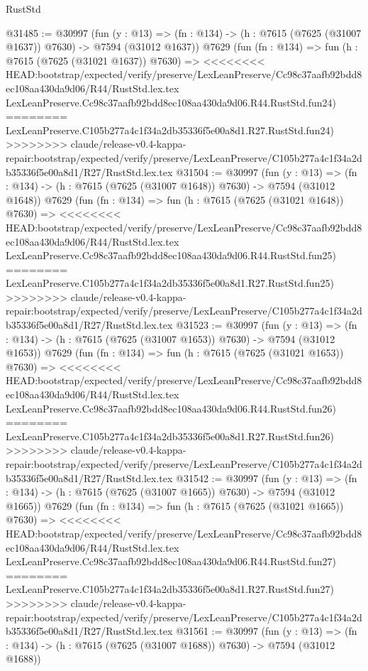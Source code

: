 \begin{lexlean}{RustStd}
\begin{coremodule}
{\begin{coremodule}
{{{{{{{{{{{{{{{{{{{{{{{{{{{{{{{{{{@31485 := @30997
    (fun (y : @13) =>
    (fn : @134) -> (h : @7615 (@7625 (@31007 @1637)) @7630) -> @7594 (@31012 @1637))
    @7629
    (fun (fn : @134) =>
    fun (h : @7615 (@7625 (@31021 @1637)) @7630) =>
<<<<<<<< HEAD:bootstrap/expected/verify/preserve/LexLeanPreserve/Cc98c37aafb92bdd8ec108aa430da9d06/R44/RustStd.lex.tex
    LexLeanPreserve.Cc98c37aafb92bdd8ec108aa430da9d06.R44.RustStd.fun24)
========
    LexLeanPreserve.C105b277a4c1f34a2db35336f5e00a8d1.R27.RustStd.fun24)
>>>>>>>> claude/release-v0.4-kappa-repair:bootstrap/expected/verify/preserve/LexLeanPreserve/C105b277a4c1f34a2db35336f5e00a8d1/R27/RustStd.lex.tex
@31504 := @30997
    (fun (y : @13) =>
    (fn : @134) -> (h : @7615 (@7625 (@31007 @1648)) @7630) -> @7594 (@31012 @1648))
    @7629
    (fun (fn : @134) =>
    fun (h : @7615 (@7625 (@31021 @1648)) @7630) =>
<<<<<<<< HEAD:bootstrap/expected/verify/preserve/LexLeanPreserve/Cc98c37aafb92bdd8ec108aa430da9d06/R44/RustStd.lex.tex
    LexLeanPreserve.Cc98c37aafb92bdd8ec108aa430da9d06.R44.RustStd.fun25)
========
    LexLeanPreserve.C105b277a4c1f34a2db35336f5e00a8d1.R27.RustStd.fun25)
>>>>>>>> claude/release-v0.4-kappa-repair:bootstrap/expected/verify/preserve/LexLeanPreserve/C105b277a4c1f34a2db35336f5e00a8d1/R27/RustStd.lex.tex
@31523 := @30997
    (fun (y : @13) =>
    (fn : @134) -> (h : @7615 (@7625 (@31007 @1653)) @7630) -> @7594 (@31012 @1653))
    @7629
    (fun (fn : @134) =>
    fun (h : @7615 (@7625 (@31021 @1653)) @7630) =>
<<<<<<<< HEAD:bootstrap/expected/verify/preserve/LexLeanPreserve/Cc98c37aafb92bdd8ec108aa430da9d06/R44/RustStd.lex.tex
    LexLeanPreserve.Cc98c37aafb92bdd8ec108aa430da9d06.R44.RustStd.fun26)
========
    LexLeanPreserve.C105b277a4c1f34a2db35336f5e00a8d1.R27.RustStd.fun26)
>>>>>>>> claude/release-v0.4-kappa-repair:bootstrap/expected/verify/preserve/LexLeanPreserve/C105b277a4c1f34a2db35336f5e00a8d1/R27/RustStd.lex.tex
@31542 := @30997
    (fun (y : @13) =>
    (fn : @134) -> (h : @7615 (@7625 (@31007 @1665)) @7630) -> @7594 (@31012 @1665))
    @7629
    (fun (fn : @134) =>
    fun (h : @7615 (@7625 (@31021 @1665)) @7630) =>
<<<<<<<< HEAD:bootstrap/expected/verify/preserve/LexLeanPreserve/Cc98c37aafb92bdd8ec108aa430da9d06/R44/RustStd.lex.tex
    LexLeanPreserve.Cc98c37aafb92bdd8ec108aa430da9d06.R44.RustStd.fun27)
========
    LexLeanPreserve.C105b277a4c1f34a2db35336f5e00a8d1.R27.RustStd.fun27)
>>>>>>>> claude/release-v0.4-kappa-repair:bootstrap/expected/verify/preserve/LexLeanPreserve/C105b277a4c1f34a2db35336f5e00a8d1/R27/RustStd.lex.tex
@31561 := @30997
    (fun (y : @13) =>
    (fn : @134) -> (h : @7615 (@7625 (@31007 @1688)) @7630) -> @7594 (@31012 @1688))
}}}}}}}}}}}}}}}}}}}}}}}}}}}}}}}}}}
\end{coremodule}}
\end{coremodule}
\end{lexlean}
